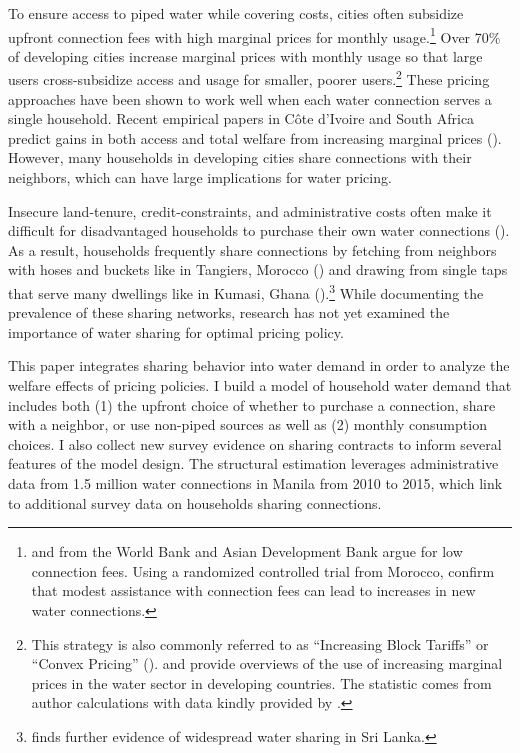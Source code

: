 \documentclass[12pt]{article}
\begin{document}
To ensure access to piped water while covering costs, cities often subsidize upfront connection fees with high marginal prices for monthly usage.\footnote{\cite{mcintosh2003asian} and \cite{komives2006distributional} from the World Bank and Asian Development Bank argue for low connection fees.  Using a randomized controlled trial from Morocco, \cite{devoto2012happiness} confirm that modest assistance with connection fees can lead to increases in new water connections.}  Over 70\% of developing cities increase marginal prices with monthly usage so that large users cross-subsidize access and usage for smaller, poorer users.\footnote{This strategy is also commonly referred to as ``Increasing Block Tariffs'' or  ``Convex Pricing'' (\cite{borenstein2012redistributional}). \cite{hoque2013state} and \cite{boland2000political} provide overviews of the use of increasing marginal prices in the water sector in developing countries.  The statistic comes from author calculations with data kindly provided by \cite{hoque2013state}.}  These pricing approaches have been shown to work well when each water connection serves a single household.  Recent empirical papers in C{\^o}te d'Ivoire and South Africa predict gains in both access and total welfare from increasing marginal prices (\cite{diakite2009proposal,szabo2015value}).  However, many households in developing cities share connections with their neighbors, which can have large implications for water pricing.  

Insecure land-tenure, credit-constraints, and administrative costs often make it difficult for disadvantaged households to purchase their own water connections (\cite{devoto2012happiness}).  As a result, households frequently share connections by fetching from neighbors with hoses and buckets like in Tangiers, Morocco (\cite{devoto2012happiness}) and drawing from single taps that serve many dwellings like in Kumasi, Ghana (\cite{whittington1992possible}).\footnote{\cite{nauges2006water} finds further evidence of widespread water sharing in Sri Lanka.}  While documenting the prevalence of these  sharing networks, research has not yet examined the importance of water sharing for optimal pricing policy.  





This paper integrates sharing behavior into water demand in order to analyze the welfare effects of pricing policies.  I build a model of household water demand that includes both (1) the upfront choice of whether to purchase a connection, share with a neighbor, or use non-piped sources as well as (2) monthly consumption choices.  I also collect new survey evidence on sharing contracts to inform several features of the model design.  The structural estimation leverages administrative data from 1.5 million water connections in Manila from 2010 to 2015, which link to additional survey data on households sharing connections.  
\end{document}
